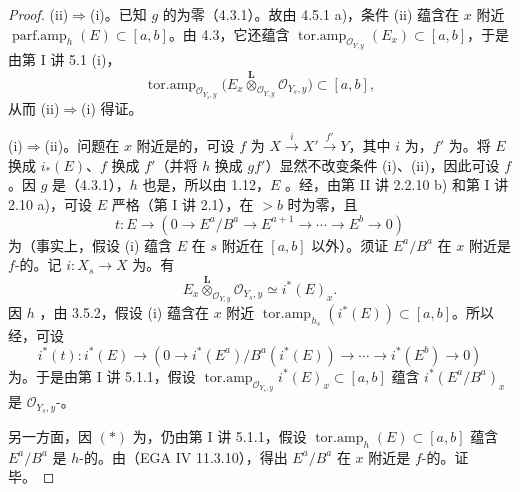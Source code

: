 \begin{proof}
(ii)$\Rightarrow$(i)。已知 $g$ 的为零（4.3.1）。故由 4.5.1 a)，条件 (ii) 蕴含在 $x$ 附近 $\operatorname{parf.amp}_h(E)\subset[a,b]$。由 4.3，它还蕴含 $\operatorname{tor.amp}_{\mathcal O_{Y,y}}(E_x)\subset[a,b]$，于是由第 I 讲 5.1 (i)，
\[
\operatorname{tor.amp}_{\mathcal O_{Y_s,y}}
\bigl(E_x\mathbin{\overset{\mathbf L}{\otimes}}_{\mathcal O_{Y,y}}\mathcal O_{Y_s,y}\bigr)\subset[a,b],
\]
从而 (ii)$\Rightarrow$(i) 得证。

(i)$\Rightarrow$(ii)。问题在 $x$ 附近是的，可设 $f$ 为 $X\xrightarrow{i}X'\xrightarrow{f'}Y$，其中 $i$ 为，$f'$ 为。将 $E$ 换成 $i_*(E)$、$f$ 换成 $f'$（并将 $h$ 换成 $gf'$）显然不改变条件 (i)、(ii)，因此可设 $f$ 。因 $g$ 是（4.3.1），$h$ 也是，所以由 1.12，$E$ 。经，由第 II 讲 2.2.10 b) 和第 I 讲 2.10 a)，可设 $E$ 严格（第 I 讲 2.1），在 $>b$ 时为零，且
\[
t:E\longrightarrow(0\longrightarrow E^a/B^a\longrightarrow E^{a+1}\longrightarrow\cdots\longrightarrow E^b\longrightarrow0)
\]
为（事实上，假设 (i) 蕴含 $E$ 在 $s$ 附近在 $[a,b]$ 以外）。须证 $E^a/B^a$ 在 $x$ 附近是 $f$-的。记 $i:X_s\to X$ 为。有
\[
E_x\mathbin{\overset{\mathbf L}{\otimes}}_{\mathcal O_{Y,y}}\mathcal O_{Y_s,y}\simeq i^*(E)_x.
\]
因 $h$ ，由 3.5.2，假设 (i) 蕴含在 $x$ 附近 $\operatorname{tor.amp}_{h_s}(i^*(E))\subset[a,b]$。所以经，可设
\[
i^*(t):i^*(E)\longrightarrow
(0\longrightarrow i^*(E^a)/B^a(i^*(E))\longrightarrow\cdots\longrightarrow i^*(E^b)\longrightarrow0)
\]
为。于是由第 I 讲 5.1.1，假设 $\operatorname{tor.amp}_{\mathcal O_{Y_s,y}}i^*(E)_x\subset[a,b]$ 蕴含 $i^*(E^a/B^a)_x$ 是 $\mathcal O_{Y_s,y}$-。

另一方面，因 $(*)$ 为，仍由第 I 讲 5.1.1，假设 $\operatorname{tor.amp}_h(E)\subset[a,b]$ 蕴含
$E^a/B^a$ 是 $h$-的。由（EGA IV 11.3.10），得出 $E^a/B^a$ 在 $x$ 附近是 $f$-的。证毕。
\end{proof}
